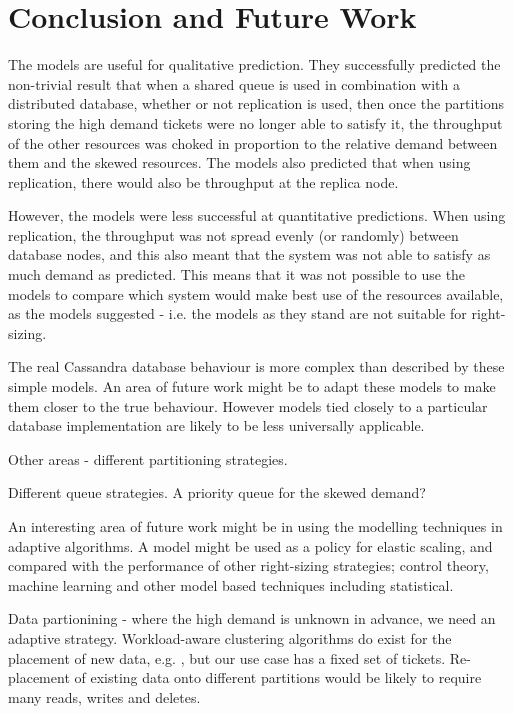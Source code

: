 %
%

\section{Conclusion and Future Work}\label{sec:conclusion-and-future-work}

\begin{shaded}
	
The models are useful for qualitative prediction.  They successfully predicted the non-trivial result that when a shared queue is used in combination with a distributed database, whether or not replication is used, then once the partitions storing the high demand tickets were no longer able to satisfy it, the throughput of the other resources was choked in proportion to the relative demand between them and the skewed resources.  The models also predicted that when using replication, there would also be throughput at the replica node.

However, the models were less successful at quantitative predictions.  When using replication, the throughput was not spread evenly (or randomly) between database nodes, and this also meant that the system was not able to satisfy as much demand as predicted.  This means that it was not possible to use the models to compare which system would make best use of the resources available, as the models suggested - i.e. the models as they stand are not suitable for right-sizing.

The real Cassandra database behaviour is more complex than described by these simple models.  An area of future work might be to adapt these models to make them closer to the true behaviour.  However models tied closely to a particular database implementation are likely to be less universally applicable.

Other areas - different partitioning strategies.

Different queue strategies.  A priority queue for the skewed demand?

An interesting area of future work might be in using the modelling techniques in adaptive algorithms.  A model might be used as a policy for elastic scaling, and compared with the performance of other right-sizing strategies; control theory, machine learning and other model based techniques including statistical.

Data partionining - where the high demand is unknown in advance, we need an adaptive strategy.  Workload-aware clustering algorithms do exist for the placement of new data, e.g. \cite{RN63}, but our use case has a fixed set of tickets.  Re-placement of existing data onto different partitions would be likely to require many reads, writes and deletes.


\end{shaded}
